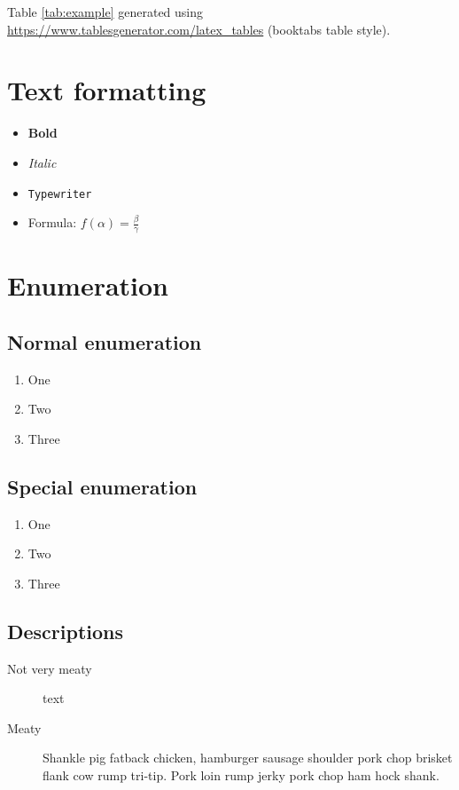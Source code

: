 \documentclass[12pt]{article}
\begin{document}
Table \ref{tab:example} generated using \url{https://www.tablesgenerator.com/latex_tables} \newline (booktabs table style).

\section{Text formatting}
\begin{itemize}
    \item \textbf{Bold} \textit{}
    \item \textit{Italic}
    \item \texttt{Typewriter}
    \item Formula: $f(\alpha) = \frac{\beta}{\gamma}$
\end{itemize}

\section{Enumeration}
\subsection{Normal enumeration}
\begin{enumerate}
    \item One
    \item Two
    \item Three
\end{enumerate}

\subsection{Special enumeration}
\begin{enumerate}[label=(\alph*.)]
    \item One
    \item Two
    \item Three
\end{enumerate}

\subsection{Descriptions}
\begin{description}
    \item[Not very meaty] text
    \item[Meaty] Shankle pig fatback chicken, hamburger sausage shoulder pork chop brisket flank cow rump tri-tip. Pork loin rump jerky pork chop ham hock shank.
\end{description}
\end{document}
